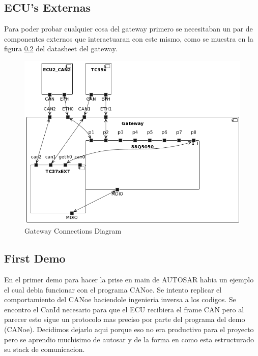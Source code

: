 \subsection{ECU's Externas}

Para poder probar cualquier cosa del gateway primero se necesitaban un par de componentes externos que interactuaran con este mismo, como se muestra en la figura \ref{} del datasheet del gateway.

\begin{figure}[!htb]
 \centering
 \includegraphics[width=\textwidth]{img/GWConnectionsDiagram.png}
 \caption{Gateway Connections Diagram}
 \label{fig:connections-diagram}
\end{figure}

\subsection{First Demo}
En el primer demo para hacer la prise en main de AUTOSAR habia un ejemplo el cual debia funcionar con el programa CANoe. Se intento replicar el comportamiento del CANoe haciendole ingenieria inversa a los codigos. Se encontro el CanId necesario para que el ECU recibiera el frame CAN pero al parecer esto sigue un protocolo mas preciso por parte del programa del demo (CANoe). Decidimos dejarlo aqui porque eso no era productivo para el proyecto pero se aprendio muchisimo de autosar y de la forma en como esta estructurado su stack de comunicacion.


